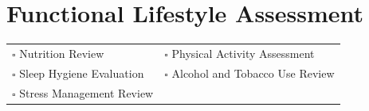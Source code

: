 
\section{Functional Lifestyle Assessment}
\label{sec:lifestyle}

\begin{tabular}{p{9cm} p{8cm}}
$\square$ Nutrition Review & $\square$ Physical Activity Assessment \\ 
$\square$ Sleep Hygiene Evaluation & $\square$ Alcohol and Tobacco Use Review \\ 
$\square$ Stress Management Review & \\ 
\end{tabular}

